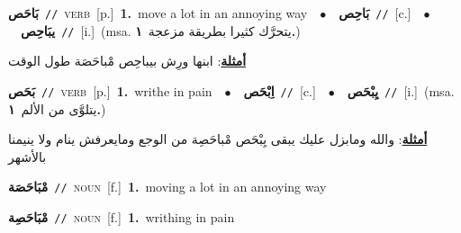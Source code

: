 \documentclass[10pt,a4paper,twoside]{article} %
\begin{document}
\begin{multicols}{2}
{\setlength\topsep{0pt}\textbf{\foreignlanguage{arabic}{بَاحَص}}\ {\color{gray}\texttt{//}\color{black}}\ \textsc{verb}\ [p.]\ \textbf{1.}~move a lot in an annoying way\ \ $\bullet$\ \ \setlength\topsep{0pt}\textbf{\foreignlanguage{arabic}{بَاحِص}}\ {\color{gray}\texttt{//}\color{black}}\ [c.]\ \ $\bullet$\ \ \setlength\topsep{0pt}\textbf{\foreignlanguage{arabic}{يبَاحِص}}\ {\color{gray}\texttt{//}\color{black}}\ [i.]\ \color{gray}(msa. \foreignlanguage{arabic}{يتحرَّك كثيرا بطريقة مزعجة}~\foreignlanguage{arabic}{\textbf{١.}})\color{black}\  \begin{flushright}\color{gray}\foreignlanguage{arabic}{\textbf{\underline{\foreignlanguage{arabic}{أمثلة}}}: ابنها ورِش بيباحِص مْباحَصَة طول الوقت}\end{flushright}\color{black}} \vspace{2mm}

{\setlength\topsep{0pt}\textbf{\foreignlanguage{arabic}{بَحَص}}\ {\color{gray}\texttt{//}\color{black}}\ \textsc{verb}\ [p.]\ \textbf{1.}~writhe in pain\ \ $\bullet$\ \ \setlength\topsep{0pt}\textbf{\foreignlanguage{arabic}{اِبْحَص}}\ {\color{gray}\texttt{//}\color{black}}\ [c.]\ \ $\bullet$\ \ \setlength\topsep{0pt}\textbf{\foreignlanguage{arabic}{يِبْحَص}}\ {\color{gray}\texttt{//}\color{black}}\ [i.]\ \color{gray}(msa. \foreignlanguage{arabic}{يتلوَّى من الألم}~\foreignlanguage{arabic}{\textbf{١.}})\color{black}\  \begin{flushright}\color{gray}\foreignlanguage{arabic}{\textbf{\underline{\foreignlanguage{arabic}{أمثلة}}}: والله ومابزل عليك يبقى يِبْحَص مْباحَصِة من الوجع ومايعرفش ينام ولا ينيمنا بالأشهر}\end{flushright}\color{black}} \vspace{2mm}

{\setlength\topsep{0pt}\textbf{\foreignlanguage{arabic}{مْبَاحَصَة}}\ {\color{gray}\texttt{//}\color{black}}\ \textsc{noun}\ [f.]\ \textbf{1.}~moving a lot in an annoying way\ } \vspace{2mm}

{\setlength\topsep{0pt}\textbf{\foreignlanguage{arabic}{مْبَاحَصِة}}\ {\color{gray}\texttt{//}\color{black}}\ \textsc{noun}\ [f.]\ \textbf{1.}~writhing in pain\ } \vspace{2mm}


\end{multicols}
\end{document}
